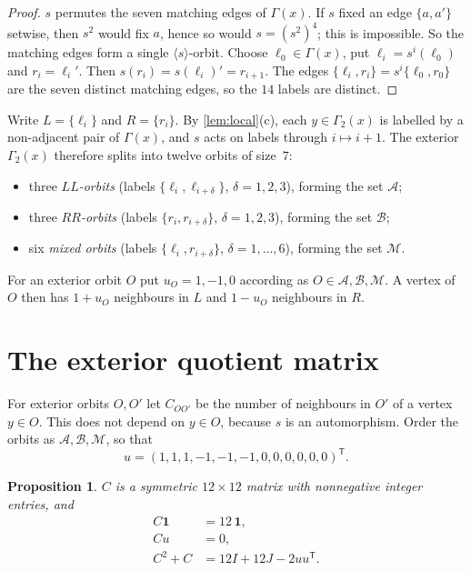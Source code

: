 \documentclass[11pt,a4paper]{amsart}
\newtheorem{proposition}[theorem]{Proposition}
\theoremstyle{definition}
\theoremstyle{remark}
\newcommand{\one}{\mathbf{1}}
\newcommand{\cA}{\mathcal{A}}
\newcommand{\cB}{\mathcal{B}}
\newcommand{\cM}{\mathcal{M}}
\begin{document}
\begin{proof}
$s$ permutes the seven matching edges of $\Gamma(x)$. If $s$ fixed an edge $\{a,a'\}$ setwise, then $s^2$
would fix $a$, hence so would $s=(s^2)^4$; this is impossible. So the matching edges form a single
$\langle s\rangle$-orbit. Choose $\ell_0\in\Gamma(x)$, put $\ell_i=s^i(\ell_0)$ and $r_i=\ell_i'$. Then
$s(r_i)=s(\ell_i)'=r_{i+1}$. The edges $\{\ell_i,r_i\}=s^i\{\ell_0,r_0\}$ are the seven distinct matching
edges, so the $14$ labels are distinct.
\end{proof}

Write $L=\{\ell_i\}$ and $R=\{r_i\}$. By \cref{lem:local}(c), each $y\in\Gamma_2(x)$ is labelled by a
non-adjacent pair of $\Gamma(x)$, and $s$ acts on labels through $i\mapsto i+1$. The exterior
$\Gamma_2(x)$ therefore splits into twelve orbits of size~$7$:
\begin{itemize}
\item three \emph{$LL$-orbits} (labels $\{\ell_i,\ell_{i+\delta}\}$, $\delta=1,2,3$), forming the set $\cA$;
\item three \emph{$RR$-orbits} (labels $\{r_i,r_{i+\delta}\}$, $\delta=1,2,3$), forming the set $\cB$;
\item six \emph{mixed orbits} (labels $\{\ell_i,r_{i+\delta}\}$, $\delta=1,\dots,6$), forming the set $\cM$.
\end{itemize}
For an exterior orbit $O$ put $u_O=1,-1,0$ according as $O\in\cA,\cB,\cM$. A vertex of $O$ then has
$1+u_O$ neighbours in $L$ and $1-u_O$ neighbours in $R$.

\section{The exterior quotient matrix}\label{sec:quotient}

For exterior orbits $O,O'$ let $C_{OO'}$ be the number of neighbours in $O'$ of a vertex $y\in O$. This does
not depend on $y\in O$, because $s$ is an automorphism. Order the orbits as $\cA,\cB,\cM$, so that
\[
u=(1,1,1,-1,-1,-1,0,0,0,0,0,0)^{\mathsf T}.
\]

\begin{proposition}\label{prop:C}
$C$ is a symmetric $12\times12$ matrix with nonnegative integer entries, and
\begin{align}
C\one&=12\,\one,\label{eq:C1}\\
Cu&=0,\label{eq:Cu}\\
C^2+C&=12I+12J-2uu^{\mathsf T}.\label{eq:C2}
\end{align}
\end{proposition}
\end{document}
